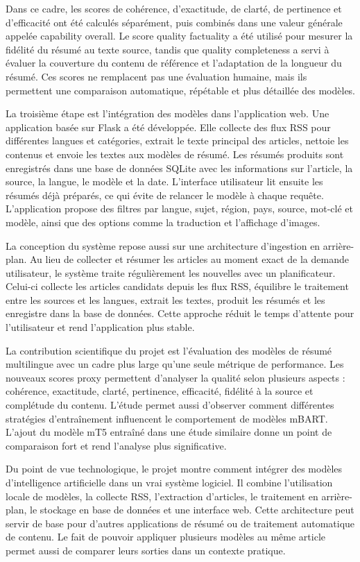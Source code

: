 Dans ce cadre, les scores de cohérence, d’exactitude, de clarté, de pertinence et d’efficacité ont été calculés séparément, puis combinés dans une valeur générale appelée capability overall. Le score quality factuality a été utilisé pour mesurer la fidélité du résumé au texte source, tandis que quality completeness a servi à évaluer la couverture du contenu de référence et l’adaptation de la longueur du résumé. Ces scores ne remplacent pas une évaluation humaine, mais ils permettent une comparaison automatique, répétable et plus détaillée des modèles.

La troisième étape est l’intégration des modèles dans l’application web. Une application basée sur Flask a été développée. Elle collecte des flux RSS pour différentes langues et catégories, extrait le texte principal des articles, nettoie les contenus et envoie les textes aux modèles de résumé. Les résumés produits sont enregistrés dans une base de données SQLite avec les informations sur l’article, la source, la langue, le modèle et la date. L’interface utilisateur lit ensuite les résumés déjà préparés, ce qui évite de relancer le modèle à chaque requête. L’application propose des filtres par langue, sujet, région, pays, source, mot-clé et modèle, ainsi que des options comme la traduction et l’affichage d’images.

La conception du système repose aussi sur une architecture d’ingestion en arrière-plan. Au lieu de collecter et résumer les articles au moment exact de la demande utilisateur, le système traite régulièrement les nouvelles avec un planificateur. Celui-ci collecte les articles candidats depuis les flux RSS, équilibre le traitement entre les sources et les langues, extrait les textes, produit les résumés et les enregistre dans la base de données. Cette approche réduit le temps d’attente pour l’utilisateur et rend l’application plus stable.

La contribution scientifique du projet est l’évaluation des modèles de résumé multilingue avec un cadre plus large qu’une seule métrique de performance. Les nouveaux scores proxy permettent d’analyser la qualité selon plusieurs aspects : cohérence, exactitude, clarté, pertinence, efficacité, fidélité à la source et complétude du contenu. L’étude permet aussi d’observer comment différentes stratégies d’entraînement influencent le comportement de modèles mBART. L’ajout du modèle mT5 entraîné dans une étude similaire donne un point de comparaison fort et rend l’analyse plus significative.

Du point de vue technologique, le projet montre comment intégrer des modèles d’intelligence artificielle dans un vrai système logiciel. Il combine l’utilisation locale de modèles, la collecte RSS, l’extraction d’articles, le traitement en arrière-plan, le stockage en base de données et une interface web. Cette architecture peut servir de base pour d’autres applications de résumé ou de traitement automatique de contenu. Le fait de pouvoir appliquer plusieurs modèles au même article permet aussi de comparer leurs sorties dans un contexte pratique.

